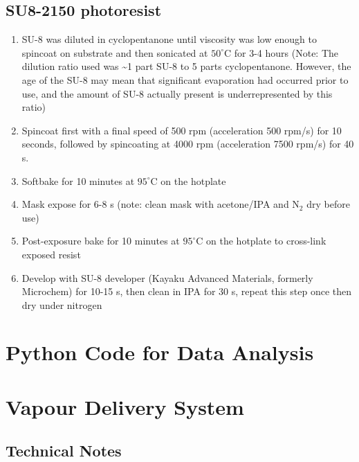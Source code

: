 \documentclass[
  a4paper,
]{scrbook}
\begin{document}
\hypertarget{su8-2150-photoresist}{%
\section{SU8-2150 photoresist}\label{su8-2150-photoresist}}

\begin{enumerate}
\def\labelenumi{\arabic{enumi}.}
\item
  SU-8 was diluted in cyclopentanone until viscosity was low enough to
  spincoat on substrate and then sonicated at \(50^\circ\)C for 3-4
  hours (Note: The dilution ratio used was \textasciitilde1 part SU-8 to
  5 parts cyclopentanone. However, the age of the SU-8 may mean that
  significant evaporation had occurred prior to use, and the amount of
  SU-8 actually present is underrepresented by this ratio)
\item
  Spincoat first with a final speed of 500 rpm (acceleration 500 rpm/s)
  for 10 seconds, followed by spincoating at 4000 rpm (acceleration 7500
  rpm/s) for 40 s.
\item
  Softbake for 10 minutes at \(95^\circ\)C on the hotplate
\item
  Mask expose for 6-8 s (note: clean mask with acetone/IPA and N\(_2\)
  dry before use)
\item
  Post-exposure bake for 10 minutes at \(95^\circ\)C on the hotplate to
  cross-link exposed resist
\item
  Develop with SU-8 developer (Kayaku Advanced Materials, formerly
  Microchem) for 10-15 s, then clean in IPA for 30 s, repeat this step
  once then dry under nitrogen
\end{enumerate}

\hypertarget{sec-python}{%
\chapter{Python Code for Data Analysis}\label{sec-python}}

\hypertarget{vapour-delivery-system}{%
\chapter{Vapour Delivery System}\label{vapour-delivery-system}}

\hypertarget{technical-notes}{%
\section{Technical Notes}\label{technical-notes}}
\end{document}
